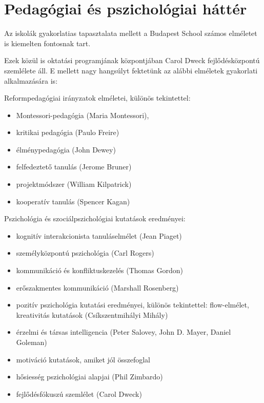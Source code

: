 \section{Pedagógiai és pszichológiai háttér}

Az iskolák gyakorlatias tapasztalata mellett a Budapest School számos
elméletet is kiemelten fontosnak tart.

Ezek közül is oktatási programjának központjában Carol Dweck
fejlődésközpontú szemlélete áll. E mellett nagy hangsúlyt fektetünk az
alábbi elméletek gyakorlati alkalmazására is:

Reformpedagógiai irányzatok elméletei, különös tekintettel:

\begin{itemize}

      \item
            Montessori-pedagógia (Maria Montessori),
      \item
            kritikai pedagógia (Paulo Freire)
      \item
            élménypedagógia (John Dewey)
      \item
            felfedeztető tanulás (Jerome Bruner)
      \item
            projektmódszer (William Kilpatrick)
      \item
            kooperatív tanulás (Spencer Kagan)
\end{itemize}

Pszichológia és szociálpszichológiai kutatások eredményei:

\begin{itemize}

      \item
            kognitív interakcionista tanuláselmélet (Jean Piaget)
      \item
            személyközpontú pszichológia (Carl Rogers)
      \item
            kommunikáció és konfliktuskezelés (Thomas Gordon)
      \item
            erőszakmentes kommunikáció (Marshall Rosenberg)
      \item
            pozitív pszichológia kutatási eredményei, különös tekintettel:
            flow-elmélet, kreativitás kutatások (Csíkszentmihályi Mihály)
      \item
            érzelmi és társas intelligencia (Peter Salovey, John D. Mayer,
            Daniel
            Goleman)
      \item motiváció kutatások, amiket jól összefoglal \citep{pink2011drive}
      \item
            hősiesség pszichológiai alapjai (Phil Zimbardo)
      \item
            fejlődésfókuszú szemlélet (Carol Dweck)
\end{itemize}